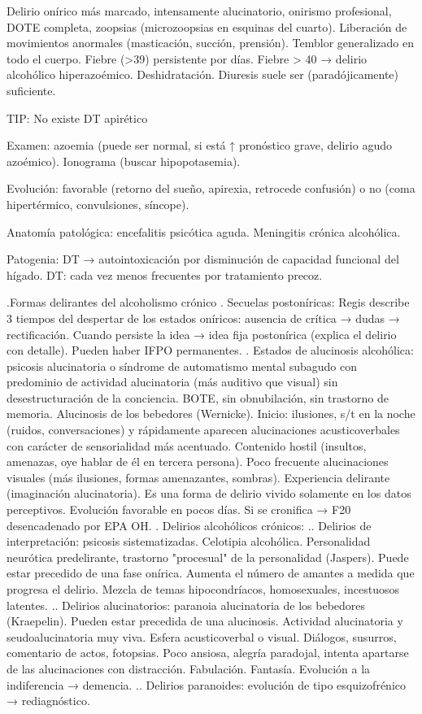 \documentclass{scrbook}
\begin{document}
Delirio onírico más marcado, intensamente alucinatorio, onirismo profesional, DOTE completa, zoopsias (microzoopsias en esquinas del cuarto). Liberación de movimientos anormales (masticación, succión, prensión). Temblor generalizado en todo el cuerpo. Fiebre (>39) persistente por días. Fiebre > 40 → delirio alcohólico hiperazoémico. Deshidratación. Diuresis suele ser (paradójicamente) suficiente.


TIP: No existe DT apirético


Examen: azoemia (puede ser normal, si está ↑ pronóstico grave, delirio agudo azoémico). Ionograma (buscar hipopotasemia).

Evolución: favorable (retorno del sueño, apirexia, retrocede confusión) o no (coma hipertérmico, convulsiones, síncope).

Anatomía patológica: encefalitis psicótica aguda. Meningitis crónica alcohólica.

Patogenia: DT → autointoxicación por disminución de capacidad funcional del hígado. DT: cada vez menos frecuentes por tratamiento precoz.

.Formas delirantes del alcoholismo crónico
. Secuelas postoníricas: Regis describe 3 tiempos del despertar de los estados oníricos: ausencia de crítica → dudas → rectificación. Cuando persiste la idea → idea fija postonírica (explica el delirio con detalle). Pueden haber IFPO permanentes.
. Estados de alucinosis alcohólica: psicosis alucinatoria o síndrome de automatismo mental subagudo con predominio de actividad alucinatoria (más auditivo que visual) sin desestructuración de la conciencia. BOTE, sin obnubilación, sin trastorno de memoria. Alucinosis de los bebedores (Wernicke). Inicio: ilusiones, s/t en la noche (ruidos, conversaciones) y rápidamente aparecen alucinaciones acusticoverbales con carácter de sensorialidad más acentuado. Contenido hostil (insultos, amenazas, oye hablar de él en tercera persona). Poco frecuente alucinaciones visuales (más ilusiones, formas amenazantes, sombras). Experiencia delirante (imaginación alucinatoria). Es una forma de delirio vivido solamente en los datos perceptivos. Evolución favorable en pocos días. Si se cronifica → F20 desencadenado por EPA OH.
. Delirios alcohólicos crónicos:
.. Delirios de interpretación: psicosis sistematizadas. Celotipia alcohólica. Personalidad neurótica predelirante, trastorno "procesual" de la personalidad (Jaspers). Puede estar precedido de una fase onírica. Aumenta el número de amantes a medida que progresa el delirio. Mezcla de temas hipocondríacos, homosexuales, incestuosos latentes.
.. Delirios alucinatorios: paranoia alucinatoria de los bebedores (Kraepelin). Pueden estar precedida de una alucinosis. Actividad alucinatoria y seudoalucinatoria muy viva. Esfera acusticoverbal o visual. Diálogos, susurros, comentario de actos, fotopsias. Poco ansiosa, alegría paradojal, intenta apartarse de las alucinaciones con distracción. Fabulación. Fantasía. Evolución a la indiferencia → demencia.
.. Delirios paranoides: evolución de tipo esquizofrénico → rediagnóstico.
\end{document}
